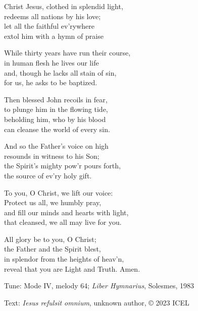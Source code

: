 \hymn

\settowidth{\versewidth}{reveal that you are Light and Truth. Amen.}

\begin{hymnverse}%
Christ Jesus, clothed in splendid light,\\
redeems all nations by his love;\\
let all the faithful ev’rywhere\\
extol him with a hymn of praise

While thirty years have run their course,\\
in human flesh he lives our life\\
and, though he lacks all stain of sin,\\
for us, he asks to be baptized.

Then blessed John recoils in fear,\\
to plunge him in the flowing tide,\\
beholding him, who by his blood\\
can cleanse the world of every sin.

And so the Father’s voice on high\\
resounds in witness to his Son;\\
the Spirit’s mighty pow’r pours forth,\\
the source of ev’ry holy gift.

To you, O Christ, we lift our voice:\\
Protect us all, we humbly pray,\\
and fill our minds and hearts with light,\\
that cleansed, we all may live for you.

All glory be to you, O Christ;\\
the Father and the Spirit blest,\\
in splendor from the heights of heav’n,\\
reveal that you are Light and Truth. Amen.
\end{hymnverse}

\begin{hymnsource}
Tune: Mode IV, melody 64; \emph{Liber Hymnarius}, Solesmes, 1983

Text: \emph{Iesus refulsit omnium}, unknown author, © 2023 ICEL
\end{hymnsource}